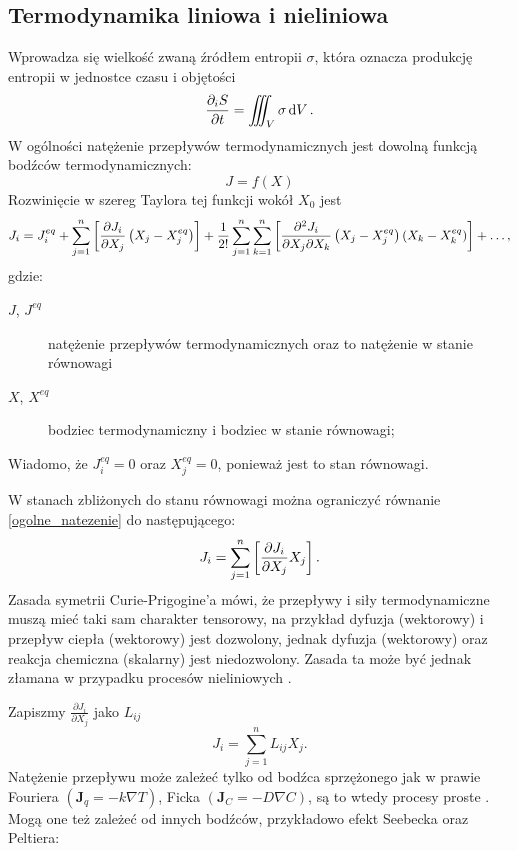 \documentclass[10pt, a4paper, twoside, onecolumn]{article}
\numberwithin{equation}{section}
\begin{document}
	\subsection{Termodynamika liniowa i nieliniowa}
	Wprowadza się wielkość zwaną źródłem entropii \(\sigma\), która oznacza produkcję entropii w jednostce czasu i objętości
	\begin{equation}
		\pdv{_{i}S}{t} = \iiint_{V}\sigma\dd{V}.
	\end{equation}
	W ogólności natężenie przepływów termodynamicznych jest dowolną funkcją bodźców termodynamicznych: 
	\[J=f\left(X\right)\]
	Rozwinięcie w szereg Taylora tej funkcji wokół \(X_{0}\) jest
	\begin{equation}\label{ogolne_natezenie}
		J_{i}=J_{i}^{eq}+\sum_{j=1}^{n}\left[\pdv{J_{i}}{X_{j}}\left(X_{j}-X_{j}^{eq}\right)\right]+\frac{1}{2!}\sum_{j=1}^{n}\sum_{k=1}^{n}\left[\pdv{J_{i}}{X_{j}}{X_{k}}\left(X_{j}-X_{j}^{eq}\right)\left(X_{k}-X_{k}^{eq}\right)\right]+\ldots,
	\end{equation}
	gdzie:
	\begin{description}
		\item[\(J\), \(J^{eq}\)] natężenie przepływów termodynamicznych oraz to natężenie w stanie równowagi
		\item[\(X\), \(X^{eq}\)] bodziec termodynamiczny i bodziec w stanie równowagi; 
	\end{description}
	Wiadomo, że \(J_{i}^{eq}=0\) oraz \(X_{j}^{eq}=0\), ponieważ jest to stan równowagi. \par
	W stanach zbliżonych do stanu równowagi można ograniczyć równanie \eqref{ogolne_natezenie} do następującego: 
	\begin{equation}\label{natezenie_liniowe}
		J_{i}=\sum_{j=1}^{n}\left[\pdv{J_{i}}{X_{j}}X_{j}\right].
	\end{equation}
	Zasada symetrii Curie-Prigogine'a mówi, że przepływy i siły termodynamiczne muszą mieć taki sam charakter tensorowy, na przykład dyfuzja (wektorowy) i przepływ ciepła (wektorowy) jest dozwolony, jednak dyfuzja (wektorowy)  oraz reakcja chemiczna (skalarny) jest niedozwolony. Zasada ta może być jednak złamana w przypadku procesów nieliniowych \cite{orlik}. \par
	Zapiszmy \(\frac{\partial J_{i}}{\partial X_{j}}\) jako \(L_{ij}\)
	\begin{equation}
		J_{i}=\sum_{j=1}^{n}L_{ij}X_{j}.
	\end{equation}
	Natężenie przepływu może zależeć tylko od bodźca sprzężonego jak w prawie Fouriera \(\left(\boldsymbol{J}_{q}=-k\nabla T\right)\), Ficka \(\left(\boldsymbol{J}_{C}=-D\nabla C\right)\), są to wtedy procesy proste \cite{orlik}. Mogą one też zależeć od innych bodźców, przykładowo efekt Seebecka oraz Peltiera:
\end{document}
